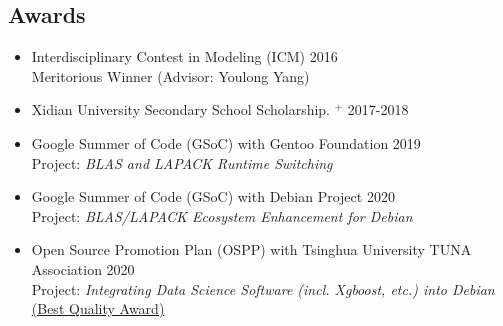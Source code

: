 \documentclass[margin,line,pifont,palatino,courier]{res}
\begin{document}
\begin{resume}
%
%
%

\section{\sc Awards}

\begin{itemize}[leftmargin=*]
	\item Interdisciplinary Contest in Modeling (ICM) \hfill 2016\\
		Meritorious Winner (Advisor: Youlong Yang)
	\item Xidian University Secondary School Scholarship.
		\href{http://see.xidian.edu.cn/html/news/9732.html}{$^+$} \hfill 2017-2018
	\item Google Summer of Code (GSoC) with Gentoo Foundation \hfill 2019\\
		Project: \textit{BLAS and LAPACK Runtime Switching}
	\item Google Summer of Code (GSoC) with Debian Project \hfill 2020\\
		Project: \textit{BLAS/LAPACK Ecosystem Enhancement for Debian}
	\item Open Source Promotion Plan (OSPP) with Tsinghua University TUNA Association \hfill 2020\\
		Project: \textit{Integrating Data Science Software (incl. Xgboost, etc.) into Debian}\\
		\href{https://isrc.iscas.ac.cn/summer2020/#/announcement}{(Best Quality Award)}
\end{itemize}


%


\end{resume}
\end{document}
